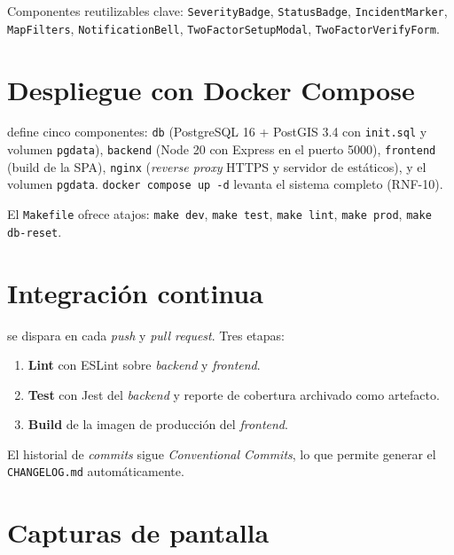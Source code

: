 Componentes reutilizables clave: \texttt{SeverityBadge}, \texttt{StatusBadge}, \texttt{IncidentMarker}, \texttt{MapFilters}, \texttt{NotificationBell}, \texttt{TwoFactorSetupModal}, \texttt{TwoFactorVerifyForm}.


\section{Despliegue con Docker Compose}
\label{sec:despliegue}

 define cinco componentes: \texttt{db} (PostgreSQL 16 + PostGIS 3.4 con \texttt{init.sql} y volumen \texttt{pgdata}), \texttt{backend} (Node 20 con Express en el puerto 5000), \texttt{frontend} (build de la SPA), \texttt{nginx} (\textit{reverse proxy} HTTPS y servidor de estáticos), y el volumen \texttt{pgdata}. \texttt{docker compose up -d} levanta el sistema completo (RNF-10).

El \texttt{Makefile} ofrece atajos: \texttt{make dev}, \texttt{make test}, \texttt{make lint}, \texttt{make prod}, \texttt{make db-reset}.


\section{Integración continua}
\label{sec:cicd}

 se dispara en cada \textit{push} y \textit{pull request}. Tres etapas:

\begin{enumerate}[leftmargin=1.2cm, itemsep=2pt]
  \item \textbf{Lint} con ESLint sobre \textit{backend} y \textit{frontend}.
  \item \textbf{Test} con Jest del \textit{backend} y reporte de cobertura archivado como artefacto.
  \item \textbf{Build} de la imagen de producción del \textit{frontend}.
\end{enumerate}

El historial de \textit{commits} sigue \textit{Conventional Commits}, lo que permite generar el \texttt{CHANGELOG.md} automáticamente.


\section{Capturas de pantalla}
\label{sec:sprints-ui}


